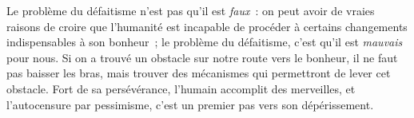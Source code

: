 \documentclass[a5paper,french,openany]{memoir}
\begin{document}


Le problème du défaitisme n'est pas qu'il est \textit{faux}~: on peut avoir de vraies raisons de croire que l'humanité est %
incapable de procéder à certains changements indispensables à son bonheur~; le problème du défaitisme, c'est qu'il est \textit{mauvais} pour nous. Si on a trouvé un obstacle sur notre route vers le bonheur, il ne faut pas baisser les bras, mais trouver des mécanismes qui permettront de lever cet obstacle. Fort de sa persévérance, l'humain accomplit des merveilles, et l'autocensure par pessimisme, c'est un premier pas vers son dépérissement. 
\end{document}

